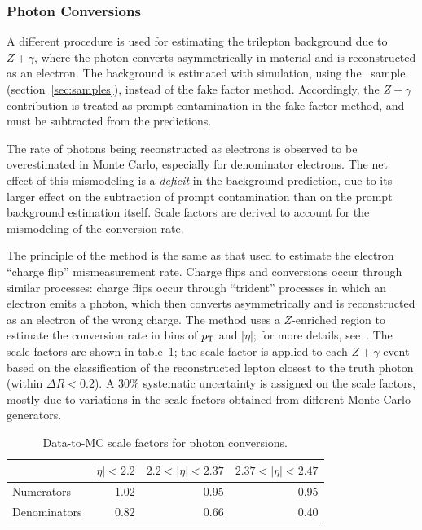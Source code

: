 \subsubsection{Photon Conversions}\label{sec:photon-conversions}
A different procedure is used for estimating the trilepton background due to $Z+\gamma$, where the photon converts asymmetrically in material and is reconstructed as an electron. The background is estimated with simulation, using the \sherpa~sample (section~\ref{sec:samples}), instead of the fake factor method.  Accordingly, the $Z+\gamma$ contribution is treated as prompt contamination in the fake factor method, and must be subtracted from the predictions. 

The rate of photons being reconstructed as electrons is observed to be overestimated in Monte Carlo, especially for denominator electrons. The net effect of this mismodeling is a \emph{deficit} in the background prediction, due to its larger effect on the subtraction of prompt contamination than on the prompt background estimation itself. Scale factors are derived to account for the mismodeling of the conversion rate. 

The principle of the method is the same as that used to estimate the electron ``charge flip'' mismeasurement rate. Charge flips and conversions occur through similar processes: charge flips occur through ``trident'' processes in which an electron emits a photon, which then converts asymmetrically and is reconstructed as an electron of the wrong charge. The method uses a $Z$-enriched region to estimate the conversion rate in bins of $p_{\text{T}}$ and $|\eta|$; for more details, see~\cite{DeViveiros:1670929}. The scale factors are shown in table~\ref{table:conversion-sfs}; the scale factor is applied to each $Z+\gamma$ event based on the classification of the reconstructed lepton closest to the truth photon (within $\Delta R<0.2$). A $30\%$ systematic uncertainty is assigned on the scale factors, mostly due to variations in the scale factors obtained from different Monte Carlo generators. 

\begin{table}[tbp]
  \centering
  \begin{tabular}{l r r r}
					 &$|\eta|<2.2$     &$2.2<|\eta|<2.37$     &$2.37<|\eta|<2.47$\\
	\hline
	Numerators       &1.02             &0.95                  &0.95\\
	Denominators     &0.82             &0.66                  &0.40\\
  \end{tabular}
  \caption{Data-to-MC scale factors for photon conversions.}
  \label{table:conversion-sfs}
\end{table}



